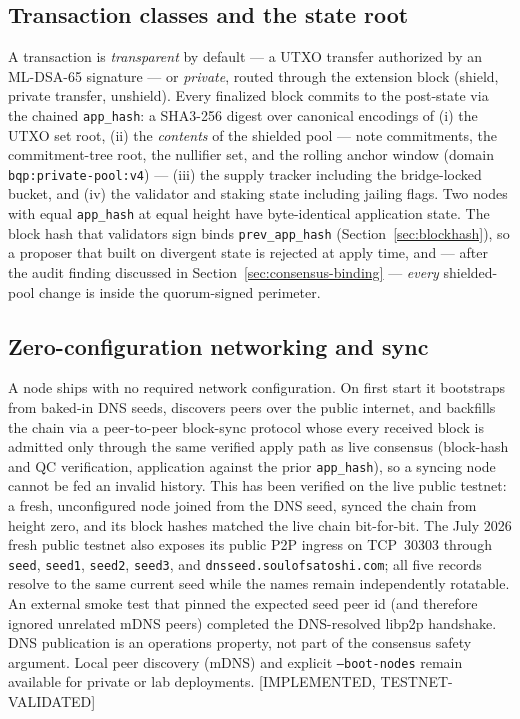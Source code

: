 \documentclass[11pt]{article}
\newcommand{\code}[1]{\texttt{#1}}
\newcommand{\mldsa}{ML\mbox{-}DSA\mbox{-}65}
\newcommand{\sha}{SHA3\mbox{-}256}
\newcommand{\statusV}{\textcolor{statgreen}{\textsf{\scriptsize[IMPLEMENTED, TESTNET-VALIDATED]}}}
\theoremstyle{plain}
\theoremstyle{definition}
\theoremstyle{remark}
\begin{document}
\subsection{Transaction classes and the state root}
\label{sec:apphash}

A transaction is \emph{transparent} by default --- a UTXO transfer authorized
by an \mldsa{} signature --- or \emph{private}, routed through the extension
block (shield, private transfer, unshield). Every finalized block commits to
the post-state via the chained \code{app\_hash}: a \sha{} digest over
canonical encodings of (i) the UTXO set root, (ii) the \emph{contents} of the
shielded pool --- note commitments, the commitment-tree root, the nullifier
set, and the rolling anchor window (domain \code{bqp:private-pool:v4}) ---
(iii) the supply tracker including the bridge-locked bucket,
and (iv) the validator and staking state including jailing flags. Two nodes
with equal \code{app\_hash} at equal height have byte-identical application
state. The block hash that validators sign binds \code{prev\_app\_hash}
(Section~\ref{sec:blockhash}), so a proposer that built on divergent state is
rejected at apply time, and --- after the audit finding discussed in
Section~\ref{sec:consensus-binding} --- \emph{every} shielded-pool change is
inside the quorum-signed perimeter.

\subsection{Zero-configuration networking and sync}
\label{sec:zeroconf}

A node ships with no required network configuration. On first start it
bootstraps from baked-in DNS seeds, discovers peers over the public internet,
and backfills the chain via a peer-to-peer block-sync protocol whose every
received block is admitted only through the same verified apply path as
live consensus (block-hash and QC verification, application against the prior
\code{app\_hash}), so a syncing node cannot be fed an invalid history. This has
been verified on the live public testnet: a fresh, unconfigured node joined
from the DNS seed, synced the chain from height zero, and its block hashes
matched the live chain bit-for-bit. The July 2026 fresh public testnet also
exposes its public P2P ingress on TCP~30303 through
\code{seed}, \code{seed1}, \code{seed2}, \code{seed3}, and
\code{dnsseed.soulofsatoshi.com}; all five records resolve to the same current
seed while the names remain independently rotatable. An external smoke test
that pinned the expected seed peer id (and therefore ignored unrelated mDNS
peers) completed the DNS-resolved libp2p handshake. DNS publication is an
operations property, not part of the consensus safety argument.
Local peer discovery (mDNS) and explicit \code{--boot-nodes} remain available
for private or lab deployments. \statusV{}
\end{document}
